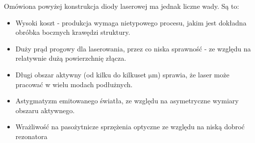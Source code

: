 \documentclass[a4paper,10pt,twoside]{report}
\begin{document}
Omówiona powyżej konstrukcja diody laserowej ma jednak liczne wady. Są to:
\begin{itemize}
 \item Wysoki koszt - produkcja wymaga nietypowego procesu, jakim jest dokładna obróbka bocznych krawędzi struktury.
 \item Duży prąd progowy dla laserowania, przez co niska sprawność - ze względu na relatywnie dużą powierzchnię złącza.
 \item Długi obszar aktywny (od kilku do kilkuset $\mathrm{\mu m}$) sprawia, że laser może pracować w wielu modach podłużnych.
 \item Astygmatyzm emitowanego światła, ze względu na asymetryczne wymiary obszaru aktywnego.
 \item Wrażliwość na pasożytnicze sprzężenia optyczne ze względu na niską dobroć rezonatora
\end{itemize}
\end{document}
